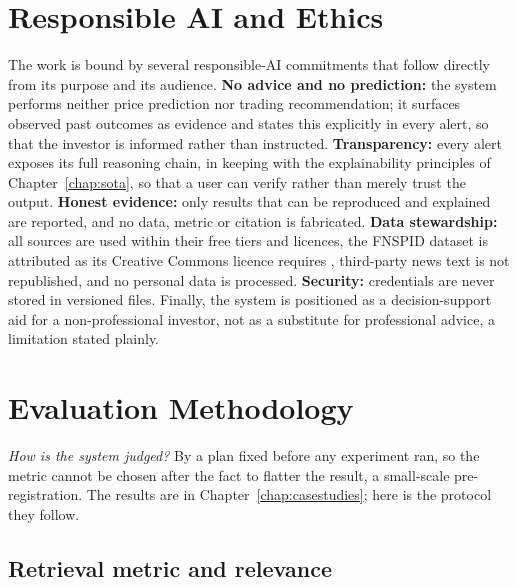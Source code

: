 \section{Responsible AI and Ethics}
\label{sec:met_ethics}

The work is bound by several responsible-AI commitments that follow directly from its purpose and its
audience. \textbf{No advice and no prediction:} the system performs neither price prediction nor trading
recommendation; it surfaces observed past outcomes as evidence and states this explicitly in every alert,
so that the investor is informed rather than instructed. \textbf{Transparency:} every alert exposes its
full reasoning chain, in keeping with the explainability principles of Chapter~\ref{chap:sota}, so that a
user can verify rather than merely trust the output. \textbf{Honest evidence:} only results that can be
reproduced and explained are reported, and no data, metric or citation is fabricated. \textbf{Data
stewardship:} all sources are used within their free tiers and licences, the FNSPID dataset is attributed
as its Creative Commons licence requires \autocite{dong2024fnspid}, third-party news text is not
republished, and no personal data is processed. \textbf{Security:} credentials are never stored in
versioned files. Finally, the system is positioned as a decision-support aid for a non-professional
investor, not as a substitute for professional advice, a limitation stated plainly.

\section{Evaluation Methodology}
\label{sec:met_evaluation}

\emph{How is the system judged?} By a plan fixed before any experiment ran, so the metric cannot be chosen
after the fact to flatter the result, a small-scale pre-registration. The results are in
Chapter~\ref{chap:casestudies}; here is the protocol they follow.

\subsection{Retrieval metric and relevance}
\label{sec:met_eval_retrieval}

